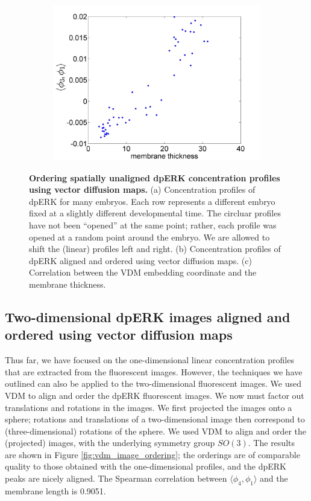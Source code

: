 \documentclass[10pt]{article}
\begin{document}
\begin{figure}[!ht]
\begin{subfigure}{0.3\textwidth}
\includegraphics[width=\textwidth]{VDM_time_corr}
\caption{}
\end{subfigure}
\caption{{\bf Ordering spatially unaligned dpERK concentration profiles using vector diffusion maps.} (a) Concentration profiles of dpERK for many embryos. Each row represents a different embryo fixed at a slightly different developmental time. The circluar profiles have not been ``opened'' at the same point; rather, each profile was opened at a random point around the embryo. We are allowed to shift the (linear) profiles left and right.
(b) Concentration profiles of dpERK aligned and ordered using vector diffusion maps.
(c) Correlation between the VDM embedding coordinate and the membrane thickness.}
\label{fig:vdm_ordering}
\end{figure}

\subsection*{Two-dimensional dpERK images aligned and ordered using vector diffusion maps}

Thus far, we have focused on the one-dimensional linear concentration profiles that are extracted from the fluorescent images.
%
However, the techniques we have outlined can also be applied to the two-dimensional fluorescent images. 
%
We used VDM to align and order the dpERK fluorescent images. 
%
We now must factor out translations and rotations in the images. 
%
We first projected the images onto a sphere;
rotations and translations of a two-dimensional image then correspond to (three-dimensional) rotations of the sphere.
%
We used VDM to align and order the (projected) images, with the underlying symmetry group $SO(3)$. 
%
The results are shown in Figure \ref{fig:vdm_image_ordering};
the orderings are of comparable quality to those obtained with the one-dimensional profiles, and the dpERK peaks are nicely aligned.
%
The Spearman correlation between $\langle \phi_4, \phi_1 \rangle$ and the membrane length is 0.9051.
\end{document}
